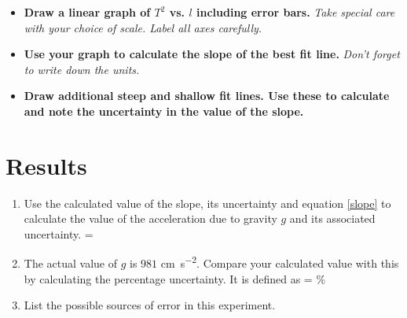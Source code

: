     \begin{itemize}

        \item \textbf{Draw a linear graph of $T^2$ vs. $l$ including error bars.} \textit{Take special care with your choice of scale. Label all axes carefully.}

        \item \textbf{Use your graph to calculate the slope of the best fit line.} \textit{Don't forget to write down the units.}

        \item \textbf{Draw additional steep and shallow fit lines. Use these to calculate and note the uncertainty in the value of the slope.}

    \end{itemize}

\section{Results}

    \begin{enumerate}
        \item Use the calculated value of the slope, its uncertainty and equation \eqref{slope} to calculate the value of the acceleration due to gravity $g$ and its associated uncertainty.
        \beq
             = 
        \eeq

        \item The actual value of $g$ is $981$ \si{\centi\meter \per \second \squared}. Compare your calculated value with this by calculating the percentage uncertainty. It is defined as
        \beq
             =   \%
        \eeq

        \item List the possible sources of error in this experiment.

    \end{enumerate}
